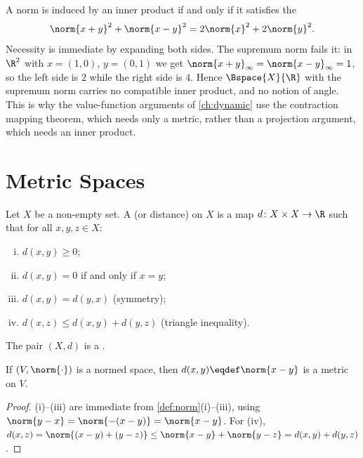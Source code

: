 \begin{remark}\label{rem:parallelogram}
	A norm is induced by an inner product if and only if it satisfies the
	\[
		\norm{x+y}^2+\norm{x-y}^2=2\norm{x}^2+2\norm{y}^2 .
	\]
	Necessity is immediate by expanding both sides. The supremum norm fails it: in
	$\R^2$ with $x=(1,0)$, $y=(0,1)$ we get
	$\norm{x+y}_\infty=\norm{x-y}_\infty=1$, so the left side is $2$ while the right
	side is $4$. Hence $\Bspace{X}{\R}$ with the supremum norm carries no compatible
	inner product, and no notion of angle. This is why the value-function arguments
	of \autoref{ch:dynamic} use the contraction mapping theorem, which needs only a
	metric, rather than a projection argument, which needs an inner product.
\end{remark}

\section{Metric Spaces}\label{sec:met-metric}

\begin{definition}[Metric]\label{def:metric}
	Let $X$ be a non-empty set. A  (or distance) on $X$ is a map
	$d\colon X\times X\to\R$ such that for all $x,y,z\in X$:
	\begin{enumerate}[(i)]
		\item $d(x,y)\geq0$;
		\item $d(x,y)=0$ if and only if $x=y$;
		\item $d(x,y)=d(y,x)$ (symmetry);
		\item $d(x,z)\leq d(x,y)+d(y,z)$ (triangle inequality).
	\end{enumerate}
	The pair $(X,d)$ is a . 
\end{definition}

\begin{proposition}\label{prop:norm-induces-metric}
	If $(V,\norm{\cdot})$ is a normed space, then $d(x,y)\eqdef\norm{x-y}$ is a
	metric on $V$.
\end{proposition}

\begin{proof}
	(i)--(iii) are immediate from \autoref{def:norm}(i)--(iii), using
	$\norm{y-x}=\norm{-(x-y)}=\norm{x-y}$. For (iv),
	$d(x,z)=\norm{(x-y)+(y-z)}\leq\norm{x-y}+\norm{y-z}=d(x,y)+d(y,z)$.
\end{proof}

